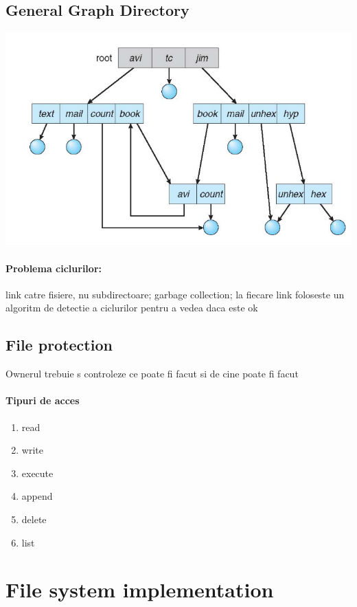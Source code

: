 \documentclass{article}
\begin{document}
\subsection*{General Graph Directory}
\begin{center}
    \includegraphics[scale=0.4]{46-ggd.png}
\end{center}
\paragraph*{Problema ciclurilor:} link catre fisiere, nu subdirectoare; garbage collection; la fiecare link foloseste un algoritm de detectie a ciclurilor pentru a vedea daca este ok

\subsection*{File protection}
Ownerul trebuie s controleze ce poate fi facut si de cine poate fi facut
\paragraph*{Tipuri de acces}
\begin{enumerate}
    \item read
    \item write
    \item execute
    \item append
    \item delete
    \item list
\end{enumerate}


\section[Ch14 File system implementation]{File system implementation}
\end{document}
